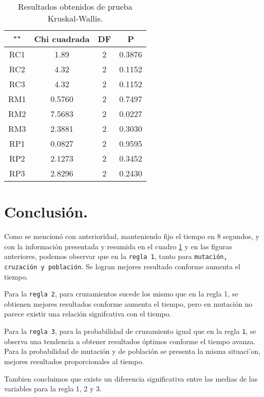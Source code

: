 \documentclass{article}
\begin{document}
\begin{table}[ht]
    \centering
    \caption{Resultados obtenidos de prueba Kruskal-Wallis.} 
    \begin{tabular}{|c|c|c|c|}
    \hline
    "" & Chi cuadrada & DF & P  \\
    \hline
    RC1 & 1.89 & 2 & 0.3876 \\
    \hline
    RC2 & 4.32 & 2 & 0.1152 \\
    \hline
    RC3 & 4.32 & 2 & 0.1152 \\
    \hline
    RM1 & 0.5760 & 2 & 0.7497 \\
    \hline
    RM2 & 7.5683 & 2 & 0.0227 \\
    \hline
    RM3 & 2.3881 & 2 & 0.3030 \\
    \hline
    RP1 & 0.0827 & 2 & 0.9595 \\
    \hline
    RP2 & 2.1273 & 2 & 0.3452 \\
    \hline
    RP3 & 2.8296 & 2 & 0.2430 \\
    \hline
\end{tabular}
    \label{cuadro 28}
\end{table}
\newpage
\section{Conclusi\'on.}
Como se mencionó con anterioridad, manteniendo fijo el tiempo en 8 segundos, y con la informaci\'on presentada y resumida en el cuadro \ref{cuadro 28} y en las figuras anteriores, podemos observar que en la \texttt{regla 1}, tanto para \texttt{mutaci\'on, cruzaci\'on y poblaci\'on}. Se logran mejores resultado conforme aumenta el tiempo. 

Para la \texttt{regla 2}, para cruzamientos sucede los mismo que en la regla 1, se obtienen mejores resultados conforme aumenta el tiempo, pero en mutaci\'on no parece existir una relaci\'on signifcativa con el tiempo.

Para la \texttt{regla 3}, para la probabilidad de cruzamiento igual que en la regla \texttt{1}, se observa una tendencia a obtener resultados \'optimos conforme el tiempo avanza. Para la probabilidad de mutaci\'on y de poblaci\'on se presenta la misma situaci'on, mejores resultados proporcionales al tiempo.

Tambien concluimos que existe un diferencia significativa entre las medias de las variables para la regla 1, 2 y 3.


\end{document}
